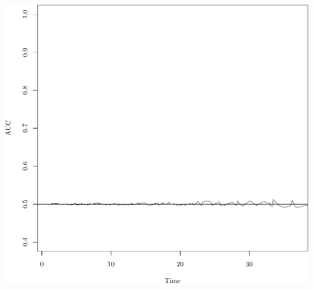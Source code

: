 \documentclass{article}\usepackage[]{graphicx}\usepackage[]{color}
\makeatletter
\def\maxwidth{ %
  \ifdim\Gin@nat@width>\linewidth
    \linewidth
  \else
    \Gin@nat@width
  \fi
}
\newenvironment{knitrout}{}{} %
\makeatother
\begin{document}
\begin{knitrout}
{\centering \includegraphics[width=\maxwidth]{figure/05-risksetROC-7} 

}



\end{knitrout}
\end{document}
